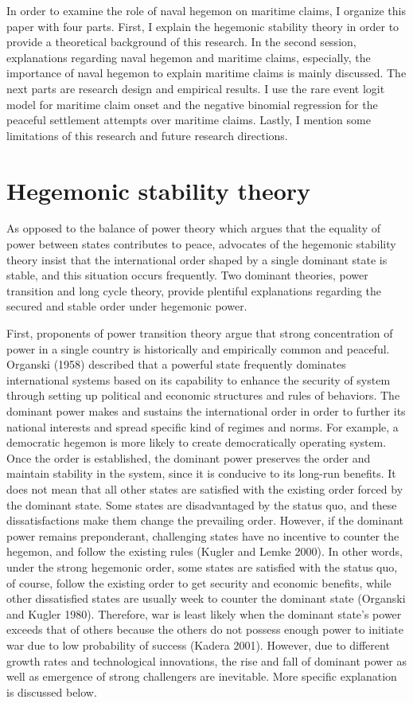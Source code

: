 \documentclass{article}
\begin{document}
In order to examine the role of naval hegemon on maritime claims, I organize this paper with four parts. First, I explain the hegemonic stability theory in order to provide a theoretical background of this research. In the second session, explanations regarding naval hegemon and maritime claims, especially, the importance of naval hegemon to explain maritime claims is mainly discussed. The next parts are research design and empirical results. I use the rare event logit model for maritime claim onset and the negative binomial regression for the peaceful settlement attempts over maritime claims. Lastly, I mention some limitations of this research and future research directions.

\section*{Hegemonic stability theory}
\hspace{0.5cm}As opposed to the balance of power theory which argues that the equality of power between states contributes to peace, advocates of the hegemonic stability theory insist that the international order shaped by a single dominant state is stable, and this situation occurs frequently. Two dominant theories, power transition and long cycle theory, provide plentiful explanations regarding the secured and stable order under hegemonic power. 

First, proponents of power transition theory argue that strong concentration of power in a single country is historically and empirically common and peaceful. Organski (1958) described that a powerful state frequently dominates international systems based on its capability to enhance the security of system through setting up political and economic structures and rules of behaviors. The dominant power makes and sustains the international order in order to further its national interests and spread specific kind of regimes and norms. For example, a democratic hegemon is more likely to create democratically operating system. Once the order is established, the dominant power preserves the order and maintain stability in the system, since it is conducive to its long-run benefits. It does not mean that all other states are satisfied with the existing order forced by the dominant state. Some states are disadvantaged by the status quo, and these dissatisfactions make them change the prevailing order. However, if the dominant power remains preponderant, challenging states have no incentive to counter the hegemon, and follow the existing rules (Kugler and Lemke 2000). In other words, under the strong hegemonic order, some states are satisfied with the status quo, of course, follow the existing order to get security and economic benefits, while other dissatisfied states are usually week to counter the dominant state (Organski and Kugler 1980). Therefore, war is least likely when the dominant state’s power exceeds that of others because the others do not possess enough power to initiate war due to low probability of success (Kadera 2001). However, due to different growth rates and technological innovations, the rise and fall of dominant power as well as emergence of strong challengers are inevitable. More specific explanation is discussed below.
\end{document}
